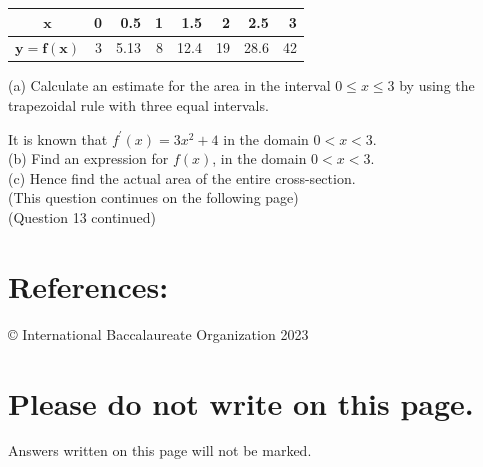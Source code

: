 \documentclass[10pt]{article}
\begin{document}
\begin{center}
\begin{tabular}{|c|r|r|r|r|r|r|r|}
\hline
$\boldsymbol{x}$ & 0 & 0.5 & 1 & 1.5 & 2 & 2.5 & 3 \\
\hline
$\boldsymbol{y}=\boldsymbol{f}(\boldsymbol{x})$ & 3 & 5.13 & 8 & 12.4 & 19 & 28.6 & 42 \\
\hline
\end{tabular}
\end{center}

(a) Calculate an estimate for the area in the interval $0 \leq x \leq 3$ by using the trapezoidal rule with three equal intervals.

It is known that $f^{\prime}(x)=3 x^{2}+4$ in the domain $0<x<3$.\\
(b) Find an expression for $f(x)$, in the domain $0<x<3$.\\
(c) Hence find the actual area of the entire cross-section.\\
(This question continues on the following page)\\
(Question 13 continued)

\section*{References:}
© International Baccalaureate Organization 2023

\section*{Please do not write on this page.}
Answers written on this page will not be marked.
\end{document}
